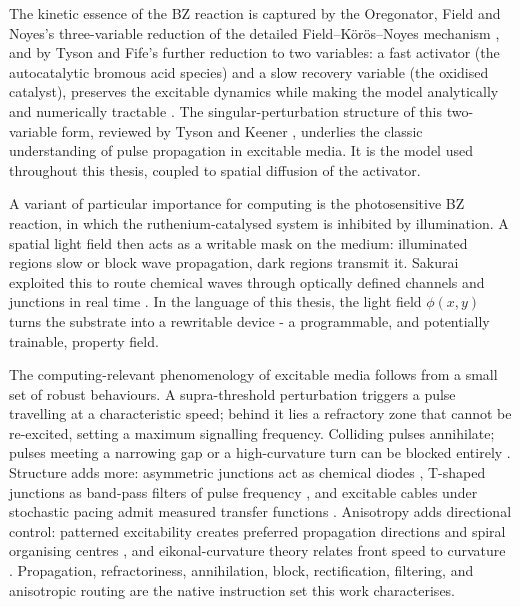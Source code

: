 The kinetic essence of the BZ reaction is captured by the Oregonator, Field and Noyes's three-variable reduction of the detailed Field--K\"or\"os--Noyes mechanism \cite{field1974oregonator}, and by Tyson and Fife's further reduction to two variables: a fast activator (the autocatalytic bromous acid species) and a slow recovery variable (the oxidised catalyst), preserves the excitable dynamics while making the model analytically and numerically tractable \cite{tyson1980target}. The singular-perturbation structure of this two-variable form, reviewed by Tyson and Keener \cite{tyson1988singular}, underlies the classic understanding of pulse propagation in excitable media. It is the model used throughout this thesis, coupled to spatial diffusion of the activator.

A variant of particular importance for computing is the photosensitive BZ reaction, in which the ruthenium-catalysed system is inhibited by illumination. A spatial light field then acts as a writable mask on the medium: illuminated regions slow or block wave propagation, dark regions transmit it. Sakurai \etal exploited this to route chemical waves through optically defined channels and junctions in real time \cite{sakurai2002design}. In the language of this thesis, the light field $\phi(x,y)$ turns the substrate into a rewritable device - a programmable, and potentially trainable, property field.

The computing-relevant phenomenology of excitable media follows from a small set of robust behaviours. A supra-threshold perturbation triggers a pulse travelling at a characteristic speed; behind it lies a refractory zone that cannot be re-excited, setting a maximum signalling frequency. Colliding pulses annihilate; pulses meeting a narrowing gap or a high-curvature turn can be blocked entirely \cite{courtemanche1993instabilities}. Structure adds more: asymmetric junctions act as chemical diodes \cite{agladze1996chemical}, T-shaped junctions as band-pass filters of pulse frequency \cite{gorecka2003tshaped}, and excitable cables under stochastic pacing admit measured transfer functions \cite{delange2009transfer}. Anisotropy adds directional control: patterned excitability creates preferred propagation directions and spiral organising centres \cite{steinbock1995anisotropy}, and eikonal-curvature theory relates front speed to curvature \cite{keener1991eikonal}. Propagation, refractoriness, annihilation, block, rectification, filtering, and anisotropic routing are the native instruction set this work characterises.


